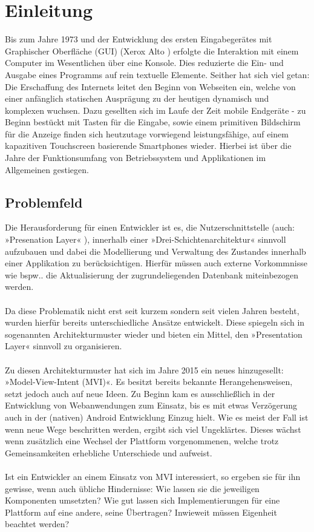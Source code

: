 \section{Einleitung}
\label{sec:einleitung}

Bis zum Jahre 1973 und der Entwicklung des ersten Eingabegerätes mit Graphischer Oberfläche (GUI) (Xerox Alto \cite{xeroxAlto}) erfolgte die Interaktion mit einem Computer im Wesentlichen über eine Konsole. Dies reduzierte die Ein- und Ausgabe eines Programms auf rein textuelle Elemente. Seither hat sich viel getan: Die Erschaffung des Internets leitet den Beginn von Webseiten ein, welche von einer anfänglich statischen Ausprägung zu der heutigen dynamisch und komplexen wuchsen. Dazu gesellten sich im Laufe der Zeit mobile Endgeräte - zu Beginn bestückt mit Tasten für die Eingabe, sowie einem primitiven Bildschirm für die Anzeige finden sich heutzutage vorwiegend leistungsfähige, auf einem kapazitiven Touchscreen basierende Smartphones wieder. Hierbei ist über die Jahre der Funktionsumfang von Betriebssystem und Applikationen im Allgemeinen gestiegen.

\subsection{Problemfeld}
\label{subsec:problemfeld}
Die Herausforderung für einen Entwickler ist es, die Nutzerschnittstelle (auch: »Presenation Layer« \cite{presentationLayerpatternsOfEnterpriseApplicationArchitectureMartinFowler}),
innerhalb einer »Drei-Schichtenarchitektur«
\cite{threeTierArchitectureDonaldWolfe2013}
sinnvoll aufzubauen und dabei die Modellierung und Verwaltung des Zustandes innerhalb einer Applikation zu berücksichtigen. Hierfür müssen auch externe Vorkommnisse wie bspw.. die Aktualisierung der zugrundeliegenden Datenbank miteinbezogen werden.
\\\\
Da diese Problematik nicht erst seit kurzem sondern seit vielen Jahren besteht, wurden hierfür bereits unterschiedliche Ansätze entwickelt. Diese spiegeln sich in sogenannten Architekturmuster wieder und bieten ein Mittel, den »Presentation Layer« sinnvoll zu organisieren.
\\\\
Zu diesen Architekturmuster hat sich im Jahre 2015 ein neues hinzugesellt: »Model-View-Intent (MVI)«. Es besitzt bereits bekannte Herangehensweisen, setzt jedoch auch auf neue Ideen. Zu Beginn kam es ausschließlich in der Entwicklung von Webanwendungen zum Einsatz, bis es mit etwas Verzögerung auch in der (nativen) Android Entwicklung Einzug hielt. Wie es meist der Fall ist wenn neue Wege beschritten werden, ergibt sich viel Ungeklärtes. Dieses wächst wenn zusätzlich eine Wechsel der Plattform vorgenommenen, welche trotz Gemeinsamkeiten erhebliche Unterschiede und aufweist.
\\\\
Ist ein Entwickler an einem Einsatz von MVI interessiert, so ergeben sie für ihn gewisse, wenn auch übliche Hindernisse: Wie lassen sie die jeweiligen Komponenten umsetzten? Wie gut lassen sich Implementierungen für eine Plattform auf eine andere, seine Übertragen? Inwieweit müssen Eigenheit beachtet werden?  

